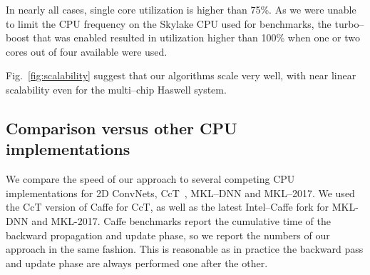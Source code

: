   In nearly all cases, single core utilization is higher
  than 75\%.  As we were unable to limit the CPU frequency on the
  Skylake CPU used for benchmarks, the turbo--boost that was enabled
  resulted in utilization higher than 100\% when one or two cores out
  of four available were used.

  Fig.~\ref{fig:scalability} suggest that our algorithms scale very
  well, with near linear scalability even for the multi--chip Haswell system.

  \subsection{Comparison versus other CPU implementations}

  We compare the speed of our approach to several competing CPU
  implementations for 2D ConvNets, CcT~\cite{hadjis2015shallow},
  MKL--DNN and MKL--2017.  We used the CcT version of Caffe for CcT,
  as well as the latest Intel--Caffe fork for MKL-DNN and MKL-2017.
  Caffe benchmarks report the cumulative time of the backward
  propagation and update phase, so we report the numbers of our
  approach in the same fashion.  This is reasonable as in practice the
  backward pass and update phase are always performed one after the
  other.




